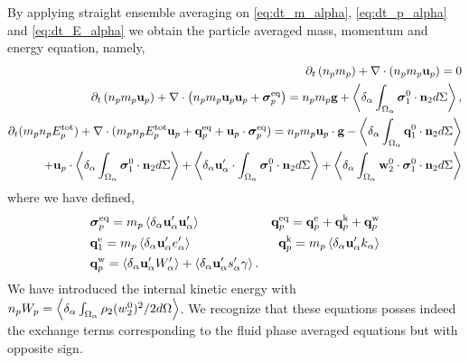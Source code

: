 
By applying straight ensemble averaging on \ref{eq:dt_m_alpha}, \ref{eq:dt_p_alpha} and \ref{eq:dt_E_alpha} we obtain the particle averaged mass, momentum and energy equation, namely, 
\begin{align}
    \label{eq:dt_hybrid_mp}
    \partial_t \left(n_p m_p\right)
    + \mathbf{\nabla}\cdot \left(n_pm_p\textbf{u}_p
    \right)
    = 
    0\\
    \label{eq:dt_hybrid_up}
    \partial_t \left(n_p m_p \textbf{u}_p\right)
    + \mathbf{\nabla}\cdot \left(n_p
    m_p \textbf{u}_p \textbf{u}_p 
    + \bm{\sigma}_p^\text{eq}
    \right)
    = 
    n_p m_p \textbf{g}
    + \left<\delta_\alpha \int_{\Omega_\alpha} {\bm{\sigma}_1^0 \cdot \textbf{n}_2} d\Sigma\right>,\\
    \label{eq:dt_hybrid_Ep}
    \partial_t(m_p n_pE_p^\text{tot})
    + \mathbf{\nabla}\cdot(m_pn_p E_p^\text{tot} \textbf{u}_p 
    + \textbf{q}_p^\text{eq} 
    + \textbf{u}_p \cdot \bm{\sigma}_p^\text{eq})
    =  n_p m_p \textbf{u}_p\cdot  \textbf{g}
    -  \left<\delta_\alpha \int_{\Omega_\alpha} \textbf{q}_1^0 \cdot \textbf{n}_2 d\Sigma\right>\nonumber\\
    + \textbf{u}_p \cdot\left<\delta_\alpha \int_{\Omega_\alpha} {\bm{\sigma}_1^0 \cdot \textbf{n}_2} d\Sigma\right>
    + \left<\delta_\alpha \textbf{u}_\alpha' \cdot\int_{\Omega_\alpha} \bm{\sigma}_1^0 \cdot \textbf{n}_2 d\Sigma\right>
    + \left<\delta_\alpha \int_{\Omega_\alpha} {\textbf{w}_2^0 \cdot\bm{\sigma}_1^0 \cdot \textbf{n}_2} d\Sigma\right>
\end{align}
where we have defined, 
\begin{align*}
    &\bm{\sigma}_p^\text{eq}
    =  m_p\left<\delta_\alpha \textbf{u}_\alpha'\textbf{u}_\alpha'\right>
    &\textbf{q}_p^\text{eq}
    =\textbf{q}_p^\text{e} 
    +\textbf{q}_p^\text{k}  
    +\textbf{q}_p^\text{w}  
    \\
    &\textbf{q}_1^\text{e}
    = m_p \left<\delta_\alpha \textbf{u}_\alpha' e_\alpha'\right> 
    &\textbf{q}_p^\text{k}
    = m_p \left<\delta_\alpha \textbf{u}_\alpha' k_\alpha\right> 
    \\
    &\textbf{q}_p^\text{w}
    = 
     \left<\delta_\alpha \textbf{u}_\alpha'W_\alpha'\right>
    + \left<\delta_\alpha \textbf{u}_\alpha' s_\alpha' \gamma\right>.
\end{align*}
We have introduced the internal kinetic energy with $n_pW_p = \left<\delta_\alpha \int_{\Omega_\alpha} {\rho_2  (w_2^0)^2/2} d\Omega\right>$. 
We recognize that these equations posses indeed the exchange terms corresponding to the fluid phase averaged equations but with opposite sign. 
